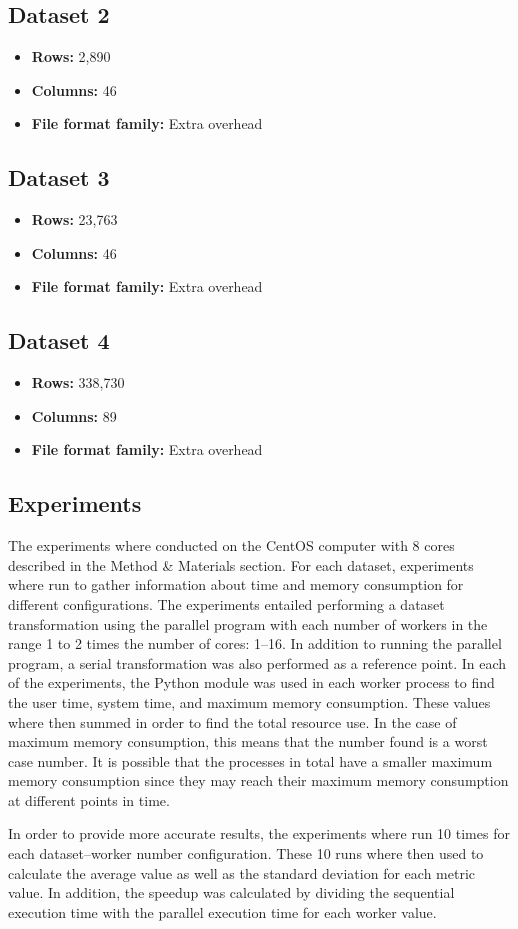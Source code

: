 \subsection{Dataset 2}
\begin{itemize}
  \item \textbf{Rows:} 2,890
  \item \textbf{Columns:} 46
  \item \textbf{File format family:} Extra overhead
\end{itemize}

\subsection{Dataset 3}
\begin{itemize}
  \item \textbf{Rows:} 23,763
  \item \textbf{Columns:} 46
  \item \textbf{File format family:} Extra overhead
\end{itemize}

\subsection{Dataset 4}
\begin{itemize}
  \item \textbf{Rows:} 338,730
  \item \textbf{Columns:} 89
  \item \textbf{File format family:} Extra overhead
\end{itemize}

\subsection{Experiments}
The experiments where conducted on the CentOS computer with 8 cores described in the Method \& Materials section.
For each dataset, experiments where run to gather information about time and memory consumption for different configurations.
The experiments entailed performing a dataset transformation using the parallel program with each number of workers in the range 1 to 2 times the number of cores: 1--16.
In addition to running the parallel program, a serial transformation was also performed as a reference point.
In each of the experiments, the Python  module was used in each worker process to find the user time, system time, and maximum memory consumption.
These values where then summed in order to find the total resource use. In the case of maximum memory consumption, this means that the number found is a worst case
number. It is possible that the processes in total have a smaller maximum memory consumption since they may reach their maximum memory consumption at different
points in time.

In order to provide more accurate results, the experiments where run 10 times for each dataset--worker number configuration. These 10 runs where then used to calculate the
average value as well as the standard deviation for each metric value. In addition, the speedup was calculated by dividing the sequential execution time with the parallel execution
time for each worker value.
